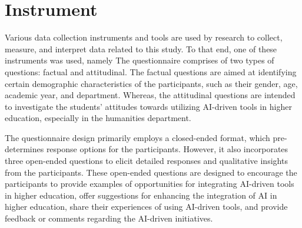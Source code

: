 \section{Instrument}
\justifying

Various data collection instruments and tools are used by research to collect, measure, and interpret data related to this study.
To that end, one of these instruments was used, namely  The questionnaire comprises of two types
of questions: factual and attitudinal. The factual questions are aimed at identifying certain demographic characteristics
of the participants, such as their gender, age, academic year, and department. Whereas, the attitudinal questions
are intended to investigate the students' attitudes towards utilizing AI-driven tools in higher education,
especially in the humanities department.


The questionnaire design primarily employs a closed-ended format, which pre-determines response
options for the participants. However, it also incorporates three open-ended questions to elicit
detailed responses and qualitative insights from the participants. These open-ended questions are
designed to encourage the participants to provide examples of opportunities for integrating AI-driven
tools in higher education, offer suggestions for enhancing the integration of AI in higher education,
share their experiences of using AI-driven tools, and provide feedback or comments regarding the AI-driven initiatives.







